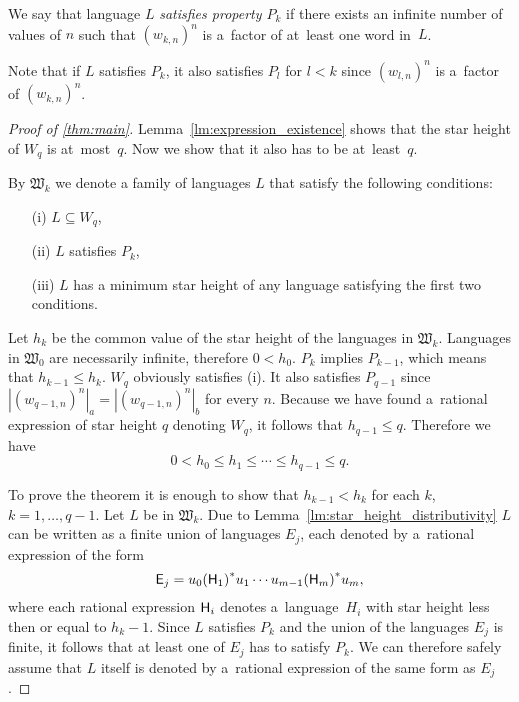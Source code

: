 \begin{defn}
    We say that language $L$ \emph{satisfies property $P_k$} if there exists an infinite number of values of $n$ such that ${(w_{k,n})}^n$ is a~factor of at~least one word in~$L$.
\end{defn}

Note that if $L$ satisfies $P_k$, it also satisfies $P_l$ for $l < k$ since ${(w_{l,n})}^n$ is a~factor of ${(w_{k,n})}^n$.

\begin{proof}[Proof of \autoref*{thm:main}]
    Lemma~\ref*{lm:expression_existence} shows that the star height of $W_q$ is at~most~$q$. Now we show that it also has to be at~least~$q$.

    By $\mathfrak{W}_k$ we denote a family of languages $L$ that satisfy the following conditions:
    \begin{itemize}
        \item[(i)] $L \subseteq W_q$,
        \item[(ii)] $L$ satisfies $P_k$,
        \item[(iii)] $L$ has a minimum star height of any language satisfying the first two conditions.
    \end{itemize}

    Let $h_k$ be the common value of the star height of the languages in $\mathfrak{W}_k$. Languages in $\mathfrak{W}_0$ are necessarily infinite, therefore $0 < h_0$. $P_k$ implies $P_{k-1}$, which means that $h_{k-1} \leq h_k$. $W_q$ obviously satisfies (i). It also satisfies $P_{q-1}$ since $|{(w_{q-1,n})}^n|_a = |{(w_{q-1,n})}^n|_b$ for every $n$. Because we have found a~rational expression of star height $q$ denoting $W_q$, it follows that $h_{q-1} \leq q$. Therefore we have
    \[
        0 < h_0 \leq h_1 \leq \dotsb \leq h_{q-1} \leq q.
    \]

    To prove the theorem it is enough to show that $h_{k-1} < h_k$ for each $k$, $k=1, \dotsc, q-1$. Let $L$ be in $\mathfrak{W}_k$. Due to Lemma~\ref*{lm:star_height_distributivity} $L$ can be written as a finite union of languages $E_j$, each denoted by a~rational expression of the form
    \[
        {\mathsf{E}}_j = u_0{({\mathsf{H}}_1)}^*u_1 \dotsm u_{m-1}{({\mathsf{H}}_m)}^*u_m,
    \]
    where each rational expression ${\mathsf{H}}_i$ denotes a~language~$H_i$ with star height less then or equal to $h_k-1$. Since $L$ satisfies $P_k$ and the union of the languages $E_j$ is finite, it follows that at least one of $E_j$ has to satisfy $P_k$. We can therefore safely assume that $L$ itself is denoted by a~rational expression of the same form as $E_j$.


\end{proof}

